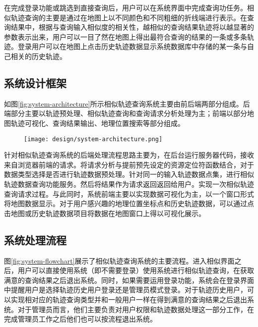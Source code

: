 在完成登录功能或跳选到直接查询后，用户可以在系统界面中完成查询功任务。相似轨迹查询的主要是通过在地图上以不同颜色和不同粗细的折线端进行表示。在查询结果中，根据与查询输入相似度的相关性，越相似的查询结果轨迹将以越显著的参数表示出来，用户可以一目了然在地图上得出最符合查询的结果的一条或多条轨迹。登录用户可以在地图上点击历史轨迹数据显示系统数据库中存储的某一条与自己相关的历史轨迹。

\subsection{系统设计框架}
\label{subsec:product perspective}
如图\ref{fig:system-architecture}所示相似轨迹查询系统主要由前后端两部分组成。后端部分主要以轨迹预处理、相似轨迹查询和查询请求分析处理为主；前端以部分地图轨迹可视化、查询结果输出、地理位置搜索等部分组成。

\begin{figure}[!htp]
  \centering
  \texttt{[image: design/system-architecture.png]}
\end{figure}

针对相似轨迹查询系统的后端处理流程思路主要为，在后台运行服务器代码，接收来自浏览器前端的请求。将请求分析与提前预先设定的资源定位符函数结合，对于数据类型选择是否进行轨迹数据预处理。针对同一的输入轨迹数据点集，进行相似轨迹数据查询功能服务。然后将结果作为请求返回返回给用户。实现一次相似轨迹查询请求过程。与此同时，系统前端主要以实现数据可视化为主，以一个窗口形式将地图数据显示。对于用户感兴趣的地理位置坐标点和历史轨迹数据，可以通过点击地图或历史轨迹数据项目将数据在地图窗口上得以可视化展示。

\subsection{系统处理流程}
图\ref{fig:system-flowchart}展示了相似轨迹查询系统的主要流程。进入相似界面之后，用户可以直接使用系统（即不需要登录）使用系统进行相似轨迹查询，在获取满意的查询结果之后退出系统。同时，如果需要运用登录功能，系统会在登录界面中提醒用户是选择轨迹历史用户登录还是管理员模式登录。对于轨迹历史用户，可以实现相对应的轨迹查询类型并和一般用户一样在得到满意的查询结果之后退出系统。对于管理员而言，他们主要负责对用户权限和轨迹数据处理这一部分工作，在完成管理员工作之后他们也可以按流程退出系统。

\label{subsec:system flow}
\begin{figure}[!htp]
    \centering
    \resizebox{14cm}{!}{}
\end{figure}

